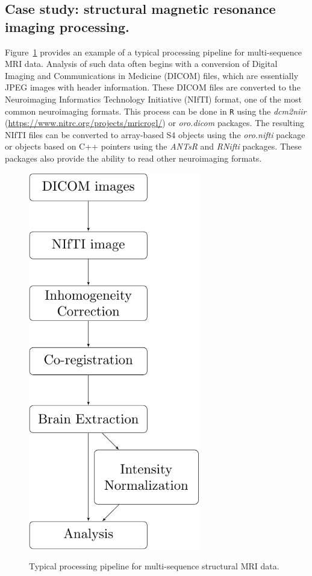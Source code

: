 \documentclass[]{elsarticle} %
\newcommand{\pkg}[1]{\emph{#1}}
\begin{document}
\subsection{Case study: structural magnetic resonance imaging processing.} Figure~\ref{fig:flow} provides an example of a typical processing pipeline for multi-sequence MRI data. Analysis of such data often begins with a conversion of Digital Imaging and Communications in Medicine (DICOM) files, which are essentially JPEG images with header information.  These DICOM files are converted to the Neuroimaging Informatics Technology Initiative (NIfTI) format, one of the most common neuroimaging formats. This process can be done in \verb"R" using the \pkg{dcm2niir} (\url{https://www.nitrc.org/projects/mricrogl/}) or \pkg{oro.dicom} \cite{dicom_nifti} packages. The resulting NIfTI files can be converted to array-based S4 objects  using the \pkg{oro.nifti} \cite{oro.nifti} package or objects based on C++ pointers using the \pkg{ANTsR} \cite{antsr} and \pkg{RNifti} \cite{Rnifti} packages.  These packages also provide the ability to read other neuroimaging formats.

\begin{figure}[!ht]
  \begin{center}
    \caption{Typical processing pipeline for multi-sequence structural MRI data.}
    \includegraphics[height=6.5in]{Imaging_Pipeline_Flowchart.pdf}
    \label{fig:flow}
  \end{center}
\end{figure}
\end{document}
